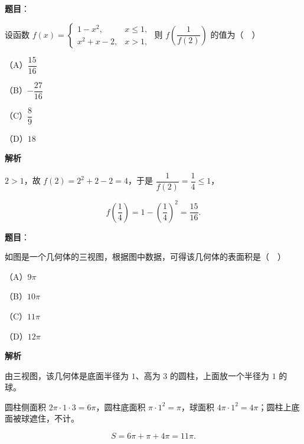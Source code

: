 \begin{answer}

\textbf{题目}：

设函数 $f(x)=\begin{cases}1-x^2,&x\leqslant1,\\ x^2+x-2,&x>1,\end{cases}$ 则 $f\left(\dfrac1{f(2)}\right)$ 的值为（　）

（A）$\dfrac{15}{16}$

（B）$-\dfrac{27}{16}$

（C）$\dfrac89$

（D）$18$

\textbf{解析}

$2>1$，故 $f(2)=2^2+2-2=4$，于是 $\dfrac1{f(2)}=\dfrac14\leqslant1$，

\nopagebreak[4]
\[f\left(\frac14\right)=1-\left(\frac14\right)^2=\frac{15}{16}.\]


\end{answer}
\begin{answer}

\textbf{题目}：

如图是一个几何体的三视图，根据图中数据，可得该几何体的表面积是（　）
\nopagebreak[4]
\begin{center}\end{center}
\nopagebreak[4]
（A）$9\pi$

（B）$10\pi$

（C）$11\pi$

（D）$12\pi$

\textbf{解析}

由三视图，该几何体是底面半径为 $1$、高为 $3$ 的圆柱，上面放一个半径为 $1$ 的球。

圆柱侧面积 $2\pi\cdot1\cdot3=6\pi$，圆柱底面积 $\pi\cdot1^2=\pi$，球面积 $4\pi\cdot1^2=4\pi$；圆柱上底面被球遮住，不计。

\nopagebreak[4]
\[S=6\pi+\pi+4\pi=11\pi.\]


\end{answer}
